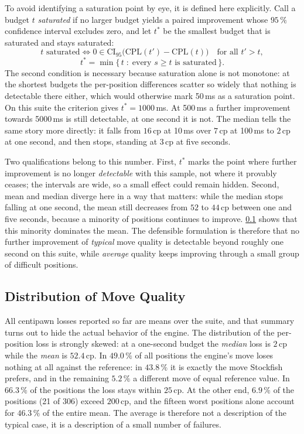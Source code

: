 To avoid identifying a saturation point by eye, it is defined here explicitly.
Call a budget $t$ \emph{saturated} if no larger budget yields a paired
improvement whose $95\,\%$ confidence interval excludes zero, and let $t^\ast$ be
the smallest budget that is saturated and stays saturated:
\[
t \text{ saturated} \iff 0 \in \text{CI}_{95}\big(\text{CPL}(t') - \text{CPL}(t)\big)
\quad \text{for all } t' > t ,
\]
\[
t^\ast = \min\{\, t \;:\; \text{every } s \geq t \text{ is saturated} \,\} .
\]
The second condition is necessary because saturation alone is not monotone: at
the shortest budgets the per-position differences scatter so widely that nothing
is detectable there either, which would otherwise mark 50\,ms as a saturation
point. On this suite the criterion gives $t^\ast = 1000$\,ms. At 500\,ms a further
improvement towards 5000\,ms is still detectable, at one second it is not. The
median tells the same story more directly: it falls from $16$\,cp at 10\,ms over
$7$\,cp at 100\,ms to $2$\,cp at one second, and then stops, standing at $3$\,cp
at five seconds.

Two qualifications belong to this number. First, $t^\ast$ marks the point where
further improvement is no longer \emph{detectable} with this sample, not where it
provably ceases; the intervals are wide, so a small effect could remain hidden.
Second, mean and median diverge here in a way that matters: while the median
stops falling at one second, the mean still decreases from $52$ to $44$\,cp
between one and five seconds, because a minority of positions continues to
improve. \cref{subsec:eval_outliers} shows that this minority dominates the mean.
The defensible formulation is therefore that no further improvement of
\emph{typical} move quality is detectable beyond roughly one second on this
suite, while \emph{average} quality keeps improving through a small group of
difficult positions.

\subsection{Distribution of Move Quality}
\label{subsec:eval_outliers}

All centipawn losses reported so far are means over the suite, and that summary
turns out to hide the actual behavior of the engine. The distribution of the
per-position loss is strongly skewed: at a one-second budget the \emph{median}
loss is $2$\,cp while the \emph{mean} is $52.4$\,cp. In $49.0\,\%$ of all
positions the engine's move loses nothing at all against the reference: in
$43.8\,\%$ it is exactly the move Stockfish prefers, and in the remaining
$5.2\,\%$ a different move of equal reference value. In $66.3\,\%$ of the
positions the loss stays within $25$\,cp. At the other end, $6.9\,\%$ of the positions
(21 of 306) exceed $200$\,cp, and the fifteen worst positions alone account for
$46.3\,\%$ of the entire mean. The average is therefore not a description of the
typical case, it is a description of a small number of failures.

